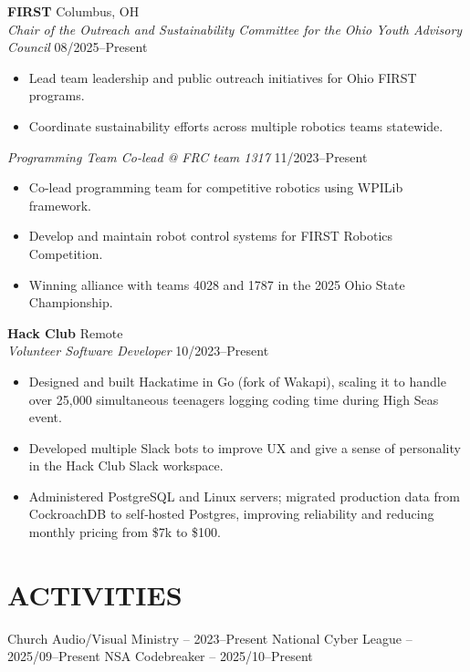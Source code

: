 \documentclass[a4paper,10pt]{article}
\newlength{\mpwidth}
\begin{document}
\textbf{FIRST} \hfill Columbus, OH\\
\textit{Chair of the Outreach and Sustainability Committee for the Ohio Youth Advisory Council} \hfill 08/2025--Present
\begin{minipage}{\mpwidth}
\begin{itemize}[nosep,after=\strut, leftmargin=1em, itemsep=3pt,label=--]
\item Lead team leadership and public outreach initiatives for Ohio FIRST programs.
\item Coordinate sustainability efforts across multiple robotics teams statewide.
\end{itemize}
\end{minipage}

\textit{Programming Team Co-lead @ FRC team 1317} \hfill 11/2023--Present
\begin{minipage}{\mpwidth}
\begin{itemize}[nosep,after=\strut, leftmargin=1em, itemsep=3pt,label=--]
\item Co-lead programming team for competitive robotics using WPILib framework.
\item Develop and maintain robot control systems for FIRST Robotics Competition.
\item Winning alliance with teams 4028 and 1787 in the 2025 Ohio State Championship.
\end{itemize}
\end{minipage}

\textbf{Hack Club} \hfill Remote\\
\textit{Volunteer Software Developer} \hfill 10/2023--Present
\begin{minipage}{\mpwidth}
\begin{itemize}[nosep,after=\strut, leftmargin=1em, itemsep=3pt,label=--]
\item Designed and built Hackatime in Go (fork of Wakapi), scaling it to handle over 25,000 simultaneous teenagers logging coding time during High Seas event.
\item Developed multiple Slack bots to improve UX and give a sense of personality in the Hack Club Slack workspace.
\item Administered PostgreSQL and Linux servers; migrated production data from CockroachDB to self‑hosted Postgres, improving reliability and reducing monthly pricing from \$7k to \$100.
\end{itemize}
\end{minipage}

\section{ACTIVITIES}
\begin{center}
{\small Church Audio/Visual Ministry -- 2023--Present \textbar{} National Cyber League -- 2025/09--Present \textbar{} NSA Codebreaker -- 2025/10--Present}
\end{center}

\vfill
\end{document}
